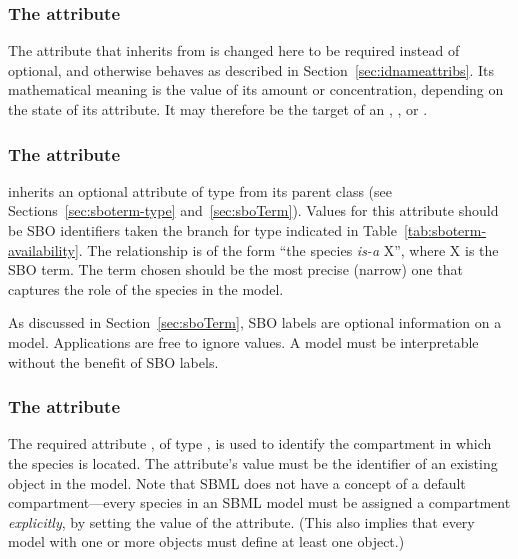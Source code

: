 \begin{blockChanged}
\subsubsection{The  attribute}

The  attribute that \Species inherits from \SBase is changed here to be required instead of optional, and otherwise behaves as described in Section~\ref{sec:idnameattribs}.  Its mathematical meaning is the value of its amount or concentration, depending on the state of its  attribute.  It may therefore be the target of an \InitialAssignment, \EventAssignment, or \Rule.
\end{blockChanged}

\subsubsection{The  attribute}
\label{sec:species-sboterm}

\Species inherits an optional  attribute of type
 from its parent class \SBase (see
Sections~\ref{sec:sboterm-type} and~\ref{sec:sboTerm}).  Values
for this attribute should be SBO identifiers taken the branch for
type \Species indicated in Table~\ref{tab:sboterm-availability}.
The relationship is of the form ``the species \emph{is-a} X'',
where X is the SBO term.  The term chosen should be the most
precise (narrow) one that captures the role of the species in the
model.

As discussed in Section~\ref{sec:sboTerm}, SBO labels are optional
information on a model.  Applications are free to ignore
 values.  A model must be interpretable without the
benefit of SBO labels.


\subsubsection{The  attribute}
\label{sec:species-compartment}

The required attribute , of type
, is used to identify the compartment in which
the species is located.  The attribute's value must be the
identifier of an existing \Compartment object in the model.  Note
that SBML does not have a concept of a default compartment---every
species in an SBML model must be assigned a compartment
\emph{explicitly}, by setting the value of the 
attribute.  (This also implies that every model with one or more
\Species objects must define at least one \Compartment object.)


